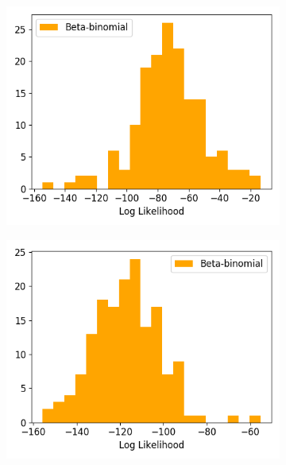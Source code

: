 \begin{figure}[p]
\begin{subfigure}[h]{0.5\linewidth}
        \label{fig:v1_binom_1ms_stimulated_log_likelihood_hist}
      \end{subfigure}
      \begin{subfigure}[h]{0.5\linewidth}
        \includegraphics[width=\linewidth]{figures/conway_maxwell/v1_beta_binom_1ms_unstimulated_log_likelihood_hist.png}
        \label{fig:v1_betabinom_1ms_unstimulated_log_likelihood_hist}
      \end{subfigure}
      \begin{subfigure}[h]{0.5\linewidth}
        \includegraphics[width=\linewidth]{figures/conway_maxwell/v1_beta_binom_1ms_stimulated_log_likelihood_hist.png}

\end{subfigure}
\end{figure}
